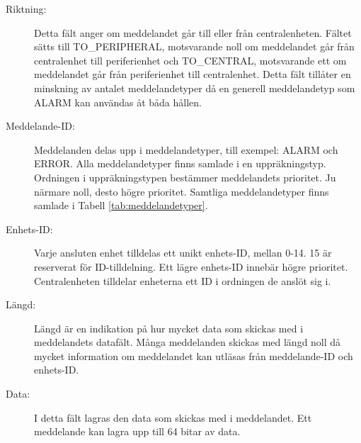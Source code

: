\documentclass[a4paper]{article}
\begin{document}
\begin{description}
    \item[Riktning:] Detta fält anger om meddelandet går till eller från centralenheten.
    Fältet sätts till TO\_PERIPHERAL, motsvarande noll om meddelandet går från centralenhet till periferienhet och TO\_CENTRAL, motsvarande ett om meddelandet går från periferienhet till centralenhet.
    Detta fält tillåter en minskning av antalet meddelandetyper då en generell meddelandetyp som ALARM kan användas åt båda hållen.

    \item[Meddelande-ID:] Meddelanden delas upp i meddelandetyper, till exempel: ALARM och ERROR.
    Alla meddelandetyper finns samlade i en uppräkningstyp.
    Ordningen i uppräkningstypen bestämmer meddelandets prioritet.
    Ju närmare noll, desto högre prioritet.
    Samtliga meddelandetyper finns samlade i Tabell \ref{tab:meddelandetyper}.

    \item[Enhets-ID:] Varje ansluten enhet tilldelas ett unikt enhets-ID, mellan 0-14.
    15 är reserverat för ID-tilldelning. Ett lägre enhets-ID innebär högre prioritet.
    Centralenheten tilldelar enheterna ett ID i ordningen de anslöt sig i.

    \item[Längd:] Längd är en indikation på hur mycket data som skickas med i meddelandets datafält.
    Många meddelanden skickas med längd noll då mycket information om meddelandet kan utläsas från meddelande-ID och enhets-ID.

    \item[Data:] I detta fält lagras den data som skickas med i meddelandet.
    Ett meddelande kan lagra upp till 64 bitar av data.
\end{description}

\begin{table}[H]
    \centering
    \caption{Diagram över CAN-meddelandets uppbyggnad samt ett exemepl på hur ett alarm-meddelande från en periferienhet ser ut.}
    \label{tab:meddelandestruktur}

\end{table}
\end{document}
